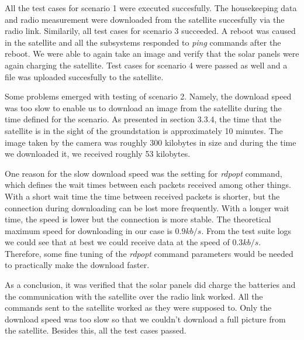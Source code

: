 \documentclass[english,12pt,a4paper,pdftex,elec,utf8]{aaltothesis}
\begin{document}
All the test cases for scenario 1 were executed succesfully. The housekeeping data and radio measurement were downloaded from the satellite succesfully via the radio link. Similarily, all test cases for scenario 3 succeeded. A reboot was caused in the satellite and all the subsystems responded to \textit{ping} commands after the reboot. We were able to again take an image and verify that the solar panels were again charging the satellite. Test cases for scenario 4 were passed as well and a file was uploaded succesfully to the satellite.\par 
Some problems emerged with testing of scenario 2. Namely, the download speed was too slow to enable us to download an image from the satellite during the time defined for the scenario. As presented in section 3.3.4, the time that the satellite is in the sight of the groundstation is approximately 10 minutes. The image taken by the camera was roughly 300 kilobytes in size and during the time we downloaded it, we received roughly 53 kilobytes.\par 
One reason for the slow download speed was the setting for \textit{rdpopt} command, which defines the wait times between each packets received among other things. With a short wait time the time between received packets is shorter, but the connection during downloading can be lost more frequently. With a longer wait time, the speed is lower but the connection is more stable. The theoretical maximum speed for downloading in our case is $0.9 kb/s$. From the test suite logs we could see that at best we could receive data at the speed of $0.3 kb/s$. Therefore, some fine tuning of the \textit{rdpopt} command parameters would be needed to practically make the download faster.\par
As a conclusion, it was verified that the solar panels did charge the batteries and the communication with the satellite over the radio link worked. All the commands sent to the satellite worked as they were supposed to. Only the download speed was too slow so that we couldn't download a full picture from the satellite. Besides this, all the test cases passed.\par      
\end{document}
